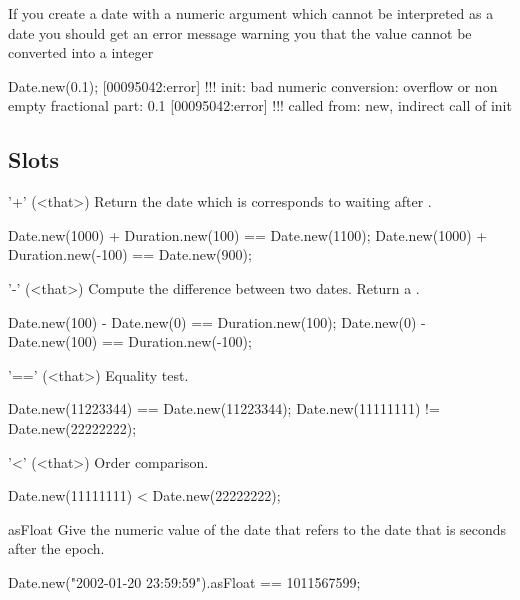 If you create a date with a numeric argument which cannot be interpreted as
a date you should get an error message warning you that the value cannot be
converted into a integer

\begin{urbiscript}
Date.new(0.1);
[00095042:error] !!! init: bad numeric conversion: overflow or non empty fractional part: 0.1
[00095042:error] !!!    called from: new, indirect call of init
\end{urbiscript}

\subsection{Slots}

\begin{urbiscriptapi}
\item['+'](<that>)%
  Return the date which is corresponds to waiting 
   after \this.
\begin{urbiassert}
Date.new(1000) + Duration.new(100) == Date.new(1100);
Date.new(1000) + Duration.new(-100) == Date.new(900);
\end{urbiassert}

\item['-'](<that>)%
  Compute the difference between two dates.  Return a
  .
\begin{urbiassert}
Date.new(100) - Date.new(0) == Duration.new(100);
Date.new(0) - Date.new(100) == Duration.new(-100);
\end{urbiassert}

\item['=='](<that>)%
  Equality test.
\begin{urbiassert}
Date.new(11223344) == Date.new(11223344);
Date.new(11111111) != Date.new(22222222);
\end{urbiassert}

\item['<'](<that>)%
  Order comparison.
\begin{urbiassert}
Date.new(11111111) < Date.new(22222222);
\end{urbiassert}

\item[asFloat]
  Give the numeric value of the date that refers to the date that is 
seconds after the epoch.
\begin{urbiassert}
Date.new("2002-01-20 23:59:59").asFloat == 1011567599;
\end{urbiassert}


\end{urbiscriptapi}
